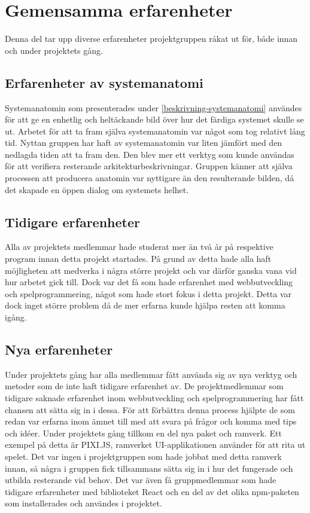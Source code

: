 
\section{Gemensamma erfarenheter}
Denna del tar upp diverse erfarenheter projektgruppen råkat ut för, både innan och under projektets gång.

\subsection{Erfarenheter av systemanatomi}
Systemanatomin som presenterades under \ref{beskrivning-systemanatomi} användes för att ge en enhetlig och heltäckande bild över hur det färdiga systemet skulle se ut. Arbetet för att ta fram själva systemanatomin var något som tog relativt lång tid. Nyttan gruppen har haft av systemanatomin var liten jämfört med den nedlagda tiden att ta fram den. Den blev mer ett verktyg som kunde användas för att verifiera resterande arkitekturbeskrivningar. Gruppen känner att själva processen att producera anatomin var nyttigare än den resulterande bilden, då det skapade en öppen dialog om systemets helhet.

\subsection{Tidigare erfarenheter}
Alla av projektets medlemmar hade studerat mer än två år på respektive program innan detta projekt startades. På grund av detta hade alla haft möjligheten att medverka i några större projekt och var därför ganska vana vid hur arbetet gick till. Dock var det få som hade erfarenhet med webbutveckling och spelprogrammering, något som hade stort fokus i detta projekt. Detta var dock inget större problem då de mer erfarna kunde hjälpa resten att komma igång.

\subsection{Nya erfarenheter}
Under projektets gång har alla medlemmar fått använda sig av nya verktyg och metoder som de inte haft tidigare erfarenhet av. De projektmedlemmar som tidigare saknade erfarenhet inom webbutveckling och spelprogrammering har fått chansen att sätta sig in i dessa. För att förbättra denna process hjälpte de som redan var erfarna inom ämnet till med att svara på frågor och komma med tips och idéer. Under projektets gång tillkom en del nya paket och ramverk. Ett exempel på detta är PIXI.JS, ramverket UI-applikationen använder för att rita ut spelet. Det var ingen i projektgruppen som hade jobbat med detta ramverk innan, så några i gruppen fick tillsammans sätta sig in i hur det fungerade och utbilda resterande vid behov. Det var även få gruppmedlemmar som hade tidigare erfarenheter med biblioteket React och en del av det olika npm-paketen som installerades och användes i projektet.

